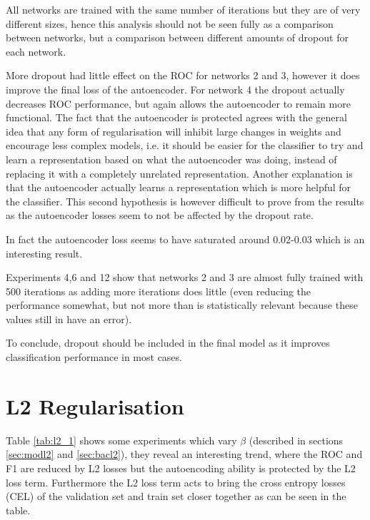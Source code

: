           All networks are trained with the same number of iterations but they are of very different sizes,
          hence this analysis should not be seen fully as a comparison between networks,
          but a comparison between different amounts of dropout for each network.

          More dropout had little effect on the ROC for networks 2 and 3, however it does
          improve the final loss of the autoencoder. For network 4 the dropout actually decreases
          ROC performance, but again allows the autoencoder to remain more functional.
          The fact that the autoencoder is protected
          agrees with the general idea that any form of regularisation will inhibit large changes
          in weights and encourage less complex models, i.e. it should be easier for the classifier to try and learn
          a representation based on what the autoencoder was doing, instead of replacing it with a completely unrelated
          representation. Another explanation is that the autoencoder
          actually learns a representation which is more helpful for the classifier. This second hypothesis is
          however difficult to prove from the results as the autoencoder losses seem to not be affected by the dropout rate.

          In fact the autoencoder loss seems to have saturated around 0.02-0.03 which
          is an interesting result.

          Experiments 4,6 and 12 show that networks 2 and 3 are almost fully
          trained with 500 iterations as adding more iterations does little
          (even reducing the performance somewhat, but not more than is
          statistically relevant because these values still in have an error).

          To conclude, dropout should be included in the final model as it improves
          classification performance in most cases.

        \newpage
        \section{L2 Regularisation}

          Table \ref{tab:l2_1} shows some experiments which vary $\beta$ (described in sections \ref{sec:modl2} and \ref{sec:bacl2}), they reveal an
          interesting trend, where the ROC and F1 are reduced by L2 losses but the autoencoding
          ability is protected by the L2 loss term. Furthermore the L2 loss term acts
          to bring the cross entropy losses (CEL) of the validation set and train set closer together as can be seen in the table.

